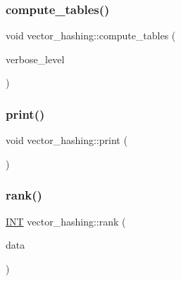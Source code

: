 \mbox{\label{classvector__hashing_aa80d25dc4d37520e54e4e8d664d665e6}} 
\subsubsection{\texorpdfstring{compute\+\_\+tables()}{compute\_tables()}}
{\footnotesize\ttfamily void vector\+\_\+hashing\+::compute\+\_\+tables (\begin{DoxyParamCaption}\item[{\mbox{\hyperlink{galois_8h_a09fddde158a3a20bd2dcadb609de11dc}{I\+NT}}}]{verbose\+\_\+level }\end{DoxyParamCaption})}

\mbox{\label{classvector__hashing_a4954caab83535e063633dd5d27a564c5}} 
\subsubsection{\texorpdfstring{print()}{print()}}
{\footnotesize\ttfamily void vector\+\_\+hashing\+::print (\begin{DoxyParamCaption}{ }\end{DoxyParamCaption})}

\mbox{\label{classvector__hashing_a4879796cc2ade5fcef891747909ec710}} 
\subsubsection{\texorpdfstring{rank()}{rank()}}
{\footnotesize\ttfamily \mbox{\hyperlink{galois_8h_a09fddde158a3a20bd2dcadb609de11dc}{I\+NT}} vector\+\_\+hashing\+::rank (\begin{DoxyParamCaption}\item[{\mbox{\hyperlink{galois_8h_a09fddde158a3a20bd2dcadb609de11dc}{I\+NT}} $\ast$}]{data }\end{DoxyParamCaption})}

\mbox{\label{classvector__hashing_abbebd3a96a6d27a34b9b49af99e2ed3d}} 
